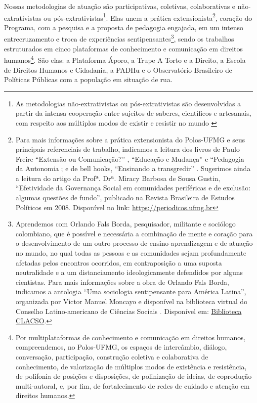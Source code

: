 \documentclass[14pt]{extarticle}
\begin{document}
Nossas metodologias de atuação são participativas, coletivas, colaborativas e não-extrativistas ou pós-extrativistas\footnote{As metodologias não-extrativistas ou pós-extrativistas são desenvolvidas a partir da intensa cooperação entre sujeitos de saberes, científicos e artesanais, com respeito aos múltiplos modos de existir e resistir no mundo \citep{acosta}}. Elas unem a prática extensionista\footnote{Para mais informações sobre a prática extensionista do Polos-UFMG e seus principais referenciais de trabalho, indicamos a leitura dos livros de Paulo Freire “Extensão ou Comunicação?” \citep{freire1}, “Educação e Mudança” \citep{freire2} e “Pedagogia da Autonomia \citep{freire3}; e de bell hooks, “Ensinando a transgredir” \citep{hooks}. Sugerimos ainda a leitura do artigo da Profª. Drª. Miracy Barbosa de Sousa Gustin, “Efetividade da Governança Social em comunidades periféricas e de exclusão: algumas questões de fundo”, publicado na Revista Brasileira de Estudos Políticos em 2008. Disponível no link: \href{https://periodicos.ufmg.br/index.php/rbep/article/view/18249/15038}{https://periodicos.ufmg.br}}, coração do Programa, com a pesquisa e a proposta de pedagogia engajada, em um intenso entrecruzamento e troca de experiências sentipensantes\footnote{Aprendemos com Orlando Fals Borda, pesquisador, militante e sociólogo colombiano, que é possível e necessária a combinação de mente e coração para o desenvolvimento de um outro processo de ensino-aprendizagem e de atuação no mundo, no qual todas as pessoas e as comunidades sejam profundamente afetadas pelos encontros ocorridos, em contraposição a uma suposta neutralidade e a um distanciamento ideologicamente defendidos por alguns cientistas. Para mais informações sobre a obra de Orlando Fals Borda, indicamos a antologia “Uma sociologia sentipensante para América Latina”, organizada por Victor Manuel Moncayo e disponível na biblioteca virtual do Conselho Latino-americano de Ciências Sociais \citep{borda}. Disponível em: \href{http://bibliotecavirtual.clacso.org.ar/ar/libros/coedicion/fborda/fborda.pdf}{Biblioteca CLACSO}.}, sendo os trabalhos estruturados em cinco plataformas de conhecimento e comunicação em direitos humanos\footnote{Por multiplataformas de conhecimento e comunicação em direitos humanos, compreendemos, no Polos-UFMG, os espaços de intercâmbio, diálogo, conversação, participação, construção coletiva e colaborativa de conhecimento, de valorização de múltiplos modos de existência e resistência, de polifonia de posições e disposições, de polinização de ideias, de coprodução multi-autoral, e, por fim, de fortalecimento de redes de cuidado e atenção em direitos humanos.}. São elas: a Plataforma Áporo, a Trupe A Torto e a Direito, a Escola de Direitos Humanos e Cidadania, a PADHu e o Observatório Brasileiro de Políticas Públicas com a população em situação de rua.\\
\end{document}
